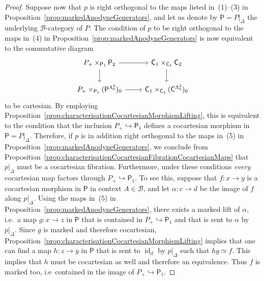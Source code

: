\documentclass[reqno]{amsart}
\numberwithin{equation}{subsection}
\theoremstyle{plain}
\theoremstyle{definition}
\let\scr=\mathcal
\let\into=\hookrightarrow
\def\BB{\scr B}
\DeclareMathOperator{\id}{id}
\newcommand{\I}[1]{\mathsf{#1}}
\begin{document}
\begin{proof}
	Suppose now that $p$ is right orthogonal to the maps listed in~(1)--(3) in Proposition~\ref{prop:markedAnodyneGenerators}, and let us denote by $\I{P}=P\vert_{\Delta}$ the underlying $\BB$-category of $P$. The condition of $p$ to be right orthogonal to the maps in~(4) in Proposition~\ref{prop:markedAnodyneGenerators} is now equivalent to the commutative diagram
	\begin{equation*}
		\begin{tikzcd}
		P_+\times_{\I{P}_1}\I{P}_2\arrow[r] \arrow[d] & \I{C}_1\times_{\I{C}_1}\I{C}_2\arrow[d]\\
		P_+\times_{\I{P}_1}(\I{P}^{\Lambda^2_0})_0\arrow[r] & \I{C}_1\times_{\I{C}_1}(\I{C}^{\Lambda^2_0})_0
		\end{tikzcd}
	\end{equation*}
	to be cartesian. By employing Proposition~\ref{prop:characterisationCocartesianMorphismLifting}, this is equivalent to the condition that the inclusion $P_+\into \I{P}_1$ defines a cocartesian morphism in $\I{P}=P\vert_{\Delta}$. Therefore, if $p$ is in addition right orthogonal to the maps in~(5) in Proposition~\ref{prop:markedAnodyneGenerators}, we conclude from Proposition~\ref{prop:characterisationCocartesianFibrationCocartesianMaps} that $p\vert_{\Delta}$ must be a cocartesian fibration. Furthermore, under these conditions \emph{every} cocartesian map factors through $P_+\into \I{P}_1$. To see this, suppose that $f\colon x\to y$ is a cocartesian morphism in $\I{P}$ in context $A\in\BB$, and let $\alpha\colon c\to d$ be the image of $f$ along $p\vert_{\Delta}$. Using the maps in~(5) in Proposition~\ref{prop:markedAnodyneGenerators}, there exists a marked lift of $\alpha$, i.e.\ a map $g\colon x\to z$ in $\I{P}$ that is contained in $P_+\into \I{P}_1$ and that is sent to $\alpha$ by $p\vert_{\Delta}$. Since $g$ is marked and therefore cocartesian, Proposition~\ref{prop:characterisationCocartesianMorphismLifting} implies that one can find a map $h\colon z\to y$ in $\I{P}$ that is sent to $\id_d$ by $p\vert_{\Delta}$ such that $hg\simeq f$. This implies that $h$ must be cocartesian as well and therefore an equivalence. Thus $f$ is marked too, i.e\ contained in the image of $P_+\into \I{P}_1$.
	

\end{proof}
\end{document}
